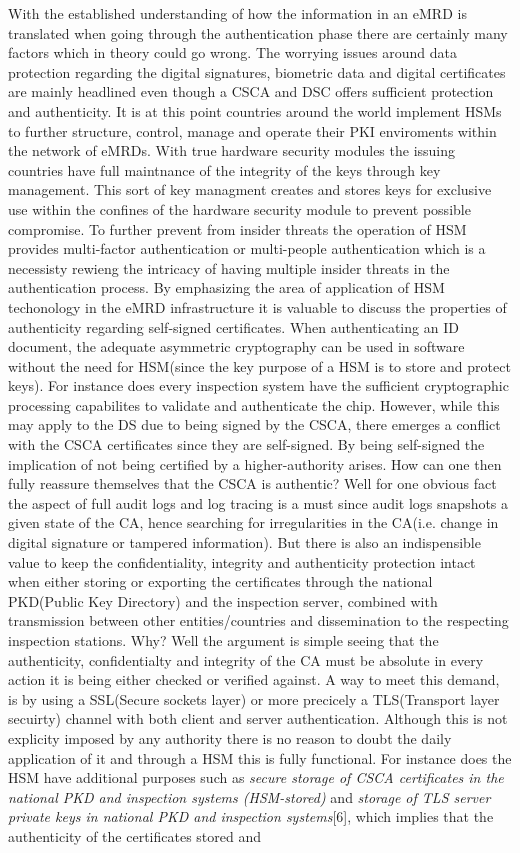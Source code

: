 \documentclass[12pt,
               a4paper,
               article,
               oneside,
               oldfontcommands,
               english]{memoir}
\begin{document}
With the established understanding of how the information in an eMRD is translated when going through the authentication phase there are certainly many factors which in theory could go wrong. The worrying issues around data protection regarding the digital signatures, biometric data and digital certificates are mainly headlined even though a CSCA and DSC offers sufficient protection and authenticity. It is at this point countries around the world implement HSMs to further structure, control, manage and operate their PKI enviroments within the network of eMRDs. With true hardware security modules the issuing countries have full maintnance of the integrity of the keys through key management. This sort of key managment creates and stores keys for exclusive use within the confines of the hardware security module to prevent possible compromise.\cite{SafeNet} To further prevent from insider threats the operation of HSM provides multi-factor authentication or multi-people authentication which is a necessisty rewieng the intricacy of having multiple insider threats in the authentication process. By emphasizing the area of application of HSM techonology in the eMRD infrastructure it is valuable to discuss the properties of authenticity regarding self-signed certificates. When authenticating an ID document, the adequate asymmetric cryptography can be used in software without the need for HSM(since the key purpose of a HSM is to store and protect keys). For instance does every inspection system have the sufficient cryptographic processing capabilites to validate and authenticate the chip. However, while this may apply to the DS due to being signed by the CSCA, there emerges a conflict with the CSCA certificates since they are self-signed. By being self-signed the implication of not being certified by a higher-authority arises. How can one then fully reassure themselves that the CSCA is authentic? Well for one obvious fact the aspect of full audit logs and log tracing is a must since audit logs snapshots a given state of the CA, hence searching for irregularities in the CA(i.e. change in digital signature or tampered information). But there is also an indispensible value to keep the confidentiality, integrity and authenticity protection intact when either storing or exporting the certificates through the national PKD(Public Key Directory) and the inspection server, combined with transmission between other entities/countries and dissemination to the respecting inspection stations. Why? Well the argument is simple seeing that the authenticity, confidentialty and integrity of the CA must be absolute in every action it is being either checked or verified against. A way to meet this demand, is by using a SSL(Secure sockets layer) or more precicely a TLS(Transport layer secuirty) channel with both client and server authentication. Although this is not explicity imposed by any authority there is no reason to doubt the daily application of it and through a HSM this is fully functional. For instance does the HSM have additional purposes such as \emph{secure storage of CSCA certificates in the national PKD and inspection systems (HSM-stored)} and \emph{storage of TLS server private keys in national PKD and inspection systems}[6], which implies that the authenticity of the certificates stored and 
\end{document}
